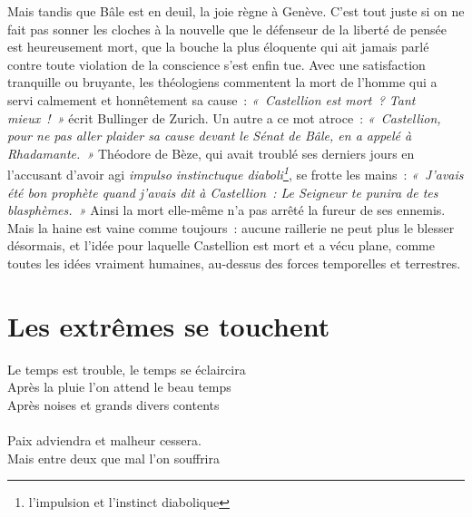 \documentclass[french,twoside]{book} %
\newcommand\foreign[1]{\emph{#1}}
\newcommand{\bibl}[1]{{\RaggedLeft{#1}\par\bigskip}}
\newcommand\chapteropen{} %
\newcommand\chapterclose{} %
\begin{document}
\noindent Mais tandis que Bâle est en deuil, la joie règne à Genève. C’est tout juste si on ne fait pas sonner les cloches à la nouvelle que le défenseur de la liberté de pensée est heureusement mort, que la bouche la plus éloquente qui ait jamais parlé contre toute violation de la conscience s’est enfin tue. Avec une satisfaction tranquille ou bruyante, les théologiens commentent la mort de l’homme qui a servi calmement et honnêtement sa cause : \emph{« Castellion est mort ? Tant mieux ! »} écrit Bullinger de Zurich. Un autre a ce mot atroce : \emph{« Castellion, pour ne pas aller plaider sa cause devant le Sénat de Bâle, en a appelé à Rhadamante. »} Théodore de Bèze, qui avait troublé ses derniers jours en l’accusant d’avoir agi \foreign{impulso instinctuque diaboli\footnote{l’impulsion et l’instinct diabolique}}, se frotte les mains : \emph{« J’avais été bon prophète quand j’avais dit à Castellion : Le Seigneur te punira de tes blasphèmes. »} Ainsi la mort elle-même n’a pas arrêté la fureur de ses ennemis. Mais la haine est vaine comme toujours : aucune raillerie ne peut plus le blesser désormais, et l’idée pour laquelle Castellion est mort et a vécu plane, comme toutes les idées vraiment humaines, au-dessus des forces temporelles et terrestres.
\chapterclose


\chapteropen

\chapter[{Les extrêmes se touchent}]{Les extrêmes se touchent}
\renewcommand{\leftmark}{Les extrêmes se touchent}


\epigraph{Le temps est trouble, le temps se éclaircira\\
Après la pluie l’on attend le beau temps\\
Après noises et grands divers contents\\
\\
Paix adviendra et malheur cessera.\\
Mais entre deux que mal l’on souffrira\\
}{
\bibl{Chanson de Marguerite d’Autriche}
}
\end{document}

